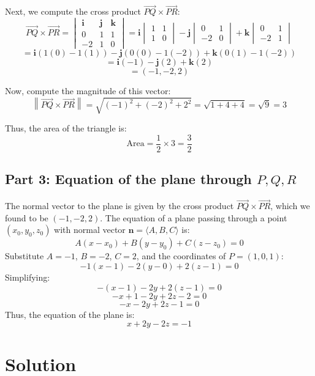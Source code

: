 \documentclass[11pt]{article}
\begin{document}
Next, we compute the cross product \( \overrightarrow{PQ} \times \overrightarrow{PR} \):
\[
\overrightarrow{PQ} \times \overrightarrow{PR} = \begin{vmatrix} \mathbf{i} & \mathbf{j} & \mathbf{k} \\ 0 & 1 & 1 \\ -2 & 1 & 0 \end{vmatrix}
= \mathbf{i} \begin{vmatrix} 1 & 1 \\ 1 & 0 \end{vmatrix} - \mathbf{j} \begin{vmatrix} 0 & 1 \\ -2 & 0 \end{vmatrix} + \mathbf{k} \begin{vmatrix} 0 & 1 \\ -2 & 1 \end{vmatrix}
\]
\[
= \mathbf{i} (1(0) - 1(1)) - \mathbf{j} (0(0) - 1(-2)) + \mathbf{k} (0(1) - 1(-2))
\]
\[
= \mathbf{i}(-1) - \mathbf{j}(2) + \mathbf{k}(2)
\]
\[
= (-1, -2, 2)
\]

Now, compute the magnitude of this vector:
\[
\left\| \overrightarrow{PQ} \times \overrightarrow{PR} \right\| = \sqrt{(-1)^2 + (-2)^2 + 2^2} = \sqrt{1 + 4 + 4} = \sqrt{9} = 3
\]

Thus, the area of the triangle is:
\[
\text{Area} = \frac{1}{2} \times 3 = \frac{3}{2}
\]

\newpage

\subsection{Part 3: Equation of the plane through \( P, Q, R \)}

The normal vector to the plane is given by the cross product \( \overrightarrow{PQ} \times \overrightarrow{PR} \), which we found to be \( (-1, -2, 2) \). The equation of a plane passing through a point \( (x_0, y_0, z_0) \) with normal vector \( \mathbf{n} = \langle A, B, C \rangle \) is:
\[
A(x - x_0) + B(y - y_0) + C(z - z_0) = 0
\]
Substitute \( A = -1 \), \( B = -2 \), \( C = 2 \), and the coordinates of \( P = (1, 0, 1) \):
\[
-1(x - 1) - 2(y - 0) + 2(z - 1) = 0
\]
Simplifying:
\[
-(x - 1) - 2y + 2(z - 1) = 0
\]
\[
-x + 1 - 2y + 2z - 2 = 0
\]
\[
-x - 2y + 2z - 1 = 0
\]
Thus, the equation of the plane is:
\[
x + 2y - 2z = -1
\]




\newpage

\section{Solution}
\end{document}
